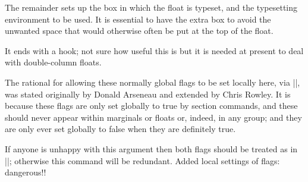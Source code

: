     The remainder sets up the box in which the float is typeset, and
    the typesetting environment to be used.  It is essential to have
    the extra box to avoid the unwanted space that would otherwise
    often be put at the top of the float.

    It ends with a hook; not sure how useful this is but it is needed
    at present to deal with double-column floats.
    
   
    \begin{teX}
  \global \setbox\@currbox
    \color@vbox
      \normalcolor
      \vbox \bgroup
        \hsize\columnwidth
        \@parboxrestore
        \@floatboxreset
}
    \end{teX}

  
  \begin{macro}{\@floatboxreset}
    
 The rational for allowing these normally global flags to be set
 locally here, via |\@parboxrestore|, was stated originally by
 Donald Arseneau and extended by Chris Rowley.
 It is because these flags are only set globally to
 true by section commands, and these should never appear within
 marginals or floats or, indeed, in any group; and they are only ever
 set globally to false when they are definitely true.

 If anyone is unhappy with this argument then both flags should be
 treated as in |\set@nobreak|; otherwise this command will be
 redundant. 
     {Added local settings of flags: dangerous!!}
 \end{macro}
 
      
    \begin{teX}
\def \@floatboxreset {%
        \reset@font
        \normalsize
        \@setminipage
}
    \end{teX}
 
  
  \begin{macro}{\@setnobreak}
    \begin{teX}
\def \@setnobreak{%
  \if@nobreak
    \let\outer@nobreak\@nobreaktrue
    \@nobreakfalse
  \fi
}
    \end{teX}
  \end{macro}

  \begin{macro}{\@setminipage}
    \begin{teX}
\def \@setminipage{%
  \@minipagetrue
  \everypar{\@minipagefalse\everypar{}}%
}
    \end{teX}
  \end{macro}



